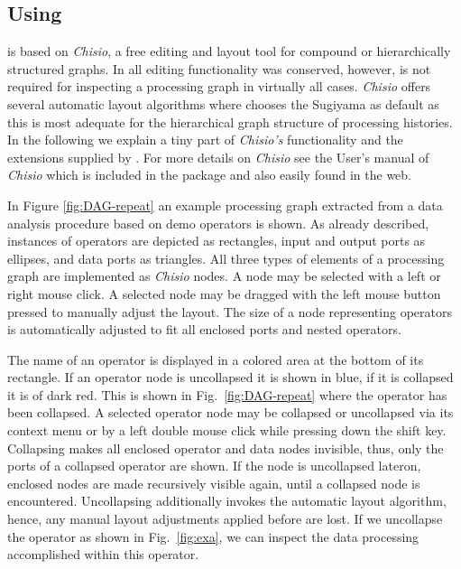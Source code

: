 \subsection{Using \mtbc}

\mtbc is based on
{\em Chisio}, a free editing and layout tool for compound or hierarchically
structured graphs. In \mtbc all editing functionality was conserved, however, is not
required for inspecting a processing graph in virtually all cases.
{\em Chisio} offers several automatic layout algorithms where \mtbc chooses
the Sugiyama as default as this is most adequate for the hierarchical graph structure
of processing histories.
In the following we explain a tiny part of {\em Chisio's} functionality and the
extensions supplied by \mtbc.
For more details on {\em Chisio} see the User's manual of {\em Chisio} which is
included in the \mtbc package and also easily found in the web.

In Figure \ref{fig:DAG-repeat} an example processing graph extracted from a data analysis procedure
based on demo operators is shown.
As already described, 
instances of operators are depicted as rectangles, input and output ports as ellipses, and data ports as triangles.
All three types of elements of a processing graph are implemented as
{\em Chisio} nodes. A node may be selected with a left  or right mouse click.
A selected node may be dragged with the left mouse button pressed to manually adjust the
layout.
The size of a node representing operators is automatically adjusted to fit all enclosed
ports and nested operators.

The name of an operator is displayed in a colored area at the bottom of its rectangle.
If an operator node is uncollapsed it is shown in blue, if it is collapsed it is
of dark red.
This is shown in Fig.~\ref{fig:DAG-repeat} 
where the operator   
has been collapsed.
A selected operator node may be collapsed or uncollapsed 
via its context menu or by a left double mouse click while pressing down the shift key.
Collapsing makes all enclosed operator and data nodes invisible, thus, only
the ports of a collapsed operator are shown.
If the node is uncollapsed lateron, enclosed nodes are made recursively visible
again, until a collapsed node is encountered.
Uncollapsing additionally invokes the automatic layout algorithm, hence, any manual
layout adjustments applied before are lost.
If we uncollapse the operator 
as shown in Fig.~\ref{fig:exa}, we can inspect the data processing 
accomplished within this operator.

